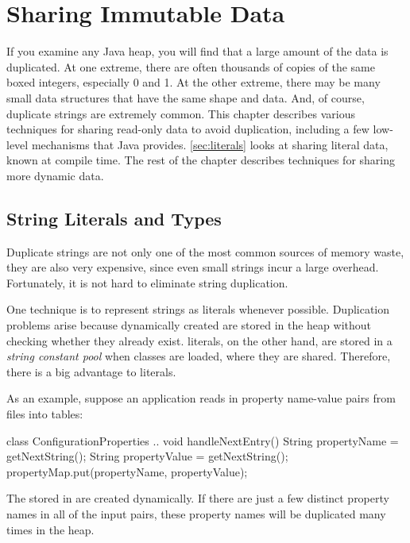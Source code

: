 \chapter{Sharing Immutable Data}
\label{chapter:sharing-immutable-data}

If you examine any Java
heap, you will find that a
large amount of the data is duplicated. At one extreme, 
there are often thousands of copies of the same boxed
integers, especially 0 and 1. At the other extreme, there may be many
 small data
structures that have the same shape and data. 
And, of course, duplicate strings are extremely common.
This chapter describes various
techniques for sharing read-only data to avoid
duplication, including a few low-level mechanisms that Java provides.
\autoref{sec:literals} looks at sharing literal data, known at compile time. 
The rest of the chapter describes techniques for sharing more
dynamic data.

\section{String Literals and  Types}
\label{sec:literals}

Duplicate strings are not only one of the
most common sources of memory waste, they are also very expensive, since even
small strings incur a large overhead. Fortunately, it is not
hard to eliminate string duplication. 

 One technique is to represent strings as  
literals whenever possible. Duplication problems arise because dynamically
 created 
are stored in the heap without checking whether they already
exist.  literals, on the other hand, are stored in a
\emph{string constant pool} when classes
are loaded, where they are shared. Therefore, there is a big advantage to
 literals.

As an example, suppose an application
reads in property name-value pairs from files into tables:
\begin{shortlisting}
class ConfigurationProperties {
    ..
	void handleNextEntry() {
		String propertyName = getNextString();
		String propertyValue = getNextString();
		propertyMap.put(propertyName, propertyValue);
	}
}
\end{shortlisting}
The  stored in  are created dynamically. If 
there are just a few distinct property names in all of the input pairs, these
property names will be duplicated many times in the heap.


